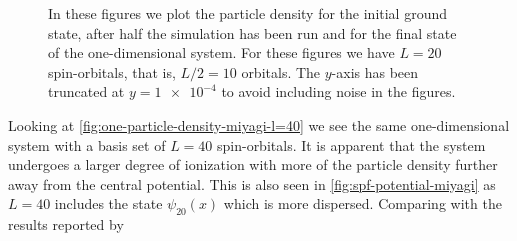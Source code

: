 \begin{figure}
            \caption{In these figures we plot the particle density for the
            initial ground state, after half the simulation has been run and for
            the final state of the one-dimensional  system.
            For these figures we have $L = 20$ spin-orbitals, that is, $L /
            2 = 10$ orbitals.
            The $y$-axis has been truncated at $y = \num{1e-4}$ to avoid
            including noise in the figures.}
            \label{fig:one-particle-density-miyagi}
        \end{figure}
        Looking at \autoref{fig:one-particle-density-miyagi-l=40} we see the
        same one-dimensional  system with a basis set of $L = 40$
        spin-orbitals.
        It is apparent that the system undergoes a larger degree of ionization
        with more of the particle density further away from the central
        potential.
        This is also seen in \autoref{fig:spf-potential-miyagi} as $L = 40$
        includes the state $\psi_{20}(x)$ which is more dispersed.
        Comparing with the results reported by \citeauthor{miyagi_and_madsen}
